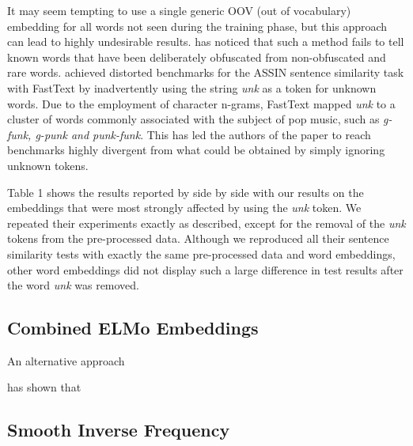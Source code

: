 \documentclass[12pt]{article}
\begin{document}
It may seem tempting to use a single generic OOV (out of vocabulary) embedding for all words not seen during the training phase, but this approach can lead to highly undesirable results. \cite{} has noticed that such a method fails to tell known words that have been deliberately obfuscated from non-obfuscated and rare words. \cite{hartmann2017portuguese} achieved distorted benchmarks for the ASSIN sentence similarity task with FastText by inadvertently using the string \textit{unk} as a token for unknown words. Due to the employment of character n-grams, FastText mapped \textit{unk} to a cluster of words commonly associated with the subject of pop music, such as \textit{g-funk, g-punk and punk-funk}. This has led the authors of the paper to reach benchmarks highly divergent from what could be obtained by simply ignoring unknown tokens.

Table 1 shows the results reported by \cite{hartmann2017portuguese} side by side with our results on the embeddings that were most strongly affected by using the \textit{unk} token. We repeated their experiments exactly as described, except for the removal of the \textit{unk} tokens from the pre-processed data. Although we reproduced all their sentence similarity tests with exactly the same pre-processed data and word embeddings, other word embeddings did not display such a large difference in test results after the word \textit{unk} was removed.

\subsection{Combined ELMo Embeddings}

An alternative approach 


\cite{gehrmann2019improving} has shown that 

\subsection{Smooth Inverse Frequency}
\end{document}
